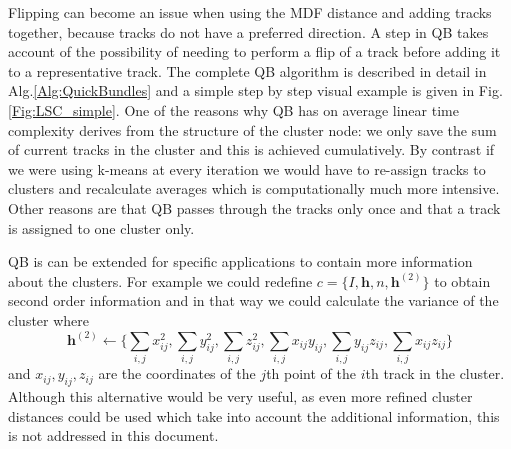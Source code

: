 \documentclass[preprint,authoryear,a4paper,10pt,onecolumn]{elsarticle}
\begin{document}
Flipping can become an issue when using the MDF distance and adding
tracks together, because tracks do not have a preferred direction.  A
step in QB takes account of the possibility of needing to perform a flip
of a track before adding it to a representative track. The complete QB
algorithm is described in detail in Alg.\ref{Alg:QuickBundles} and a
simple step by step visual example is given in Fig.\ref{Fig:LSC_simple}.
One of the reasons why QB has on average linear time complexity derives
from the structure of the cluster node: we only save the sum of current
tracks in the cluster and this is achieved cumulatively. By contrast if
we were using k-means at every iteration we would have to re-assign
tracks to clusters and recalculate averages which is computationally
much more intensive. Other reasons are that QB passes through the tracks
only once and that a track is assigned to one cluster only.

QB is can be extended for specific applications to contain more information
about the clusters. For example we could redefine $c=\{I,\mathbf{h},n,\mathbf{h}^{(2)}\}$
to obtain second order information and in that way we could calculate
the variance of the cluster where 
$$\mathbf{h}^{(2)}\leftarrow\{\sum_{i,j}x_{ij}^{2},\sum_{i,j}y_{ij}^{2},\sum_{i,j}z_{ij}^{2},\sum_{i,j}x_{ij}y_{ij},\sum_{i,j}y_{ij}z_{ij},\sum_{i,j}x_{ij}z_{ij}\}$$
and $x_{ij},y_{ij},z_{ij}$ are the coordinates of the $j$th point
of the $i$th track in the cluster. Although this alternative would
be very useful, as even more refined cluster distances could be used
which take into account the additional information, this is not addressed
in this document.
\end{document}
